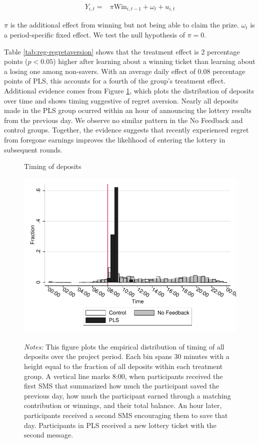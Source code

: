 \documentclass[12pt]{article}
\begin{document}
		\begin{equation} \begin{split}
		Y_{i,t} = & \pi \text{Win}_{i,t-1} + \omega_{t} + u_{i,t}
		\end{split} \label{eq:regret} \end{equation}

		$\pi$ is the additional effect from winning but not being able to claim the prize. $\omega_{t}$ is a period-specific fixed effect. We test the null hypothesis of $\pi = 0$.

		

		Table \ref{tab:reg-regretaversion} shows that the treatment effect is 2 percentage points ($p<0.05$) higher after learning about a winning ticket than learning about a losing one among non-savers. With an average daily effect of 0.08 percentage points of PLS, this accounts for a fourth of the group's treatment effect. Additional evidence comes from Figure \ref{fig:hist-deposits}, which plots the distribution of deposits over time and shows timing suggestive of regret aversion. Nearly all deposits made in the PLS group ocurred within an hour of announcing the lottery results from the previous day. We observe no similar pattern in the No Feedback and control groups. Together, the evidence suggests that recently experienced regret from foregone earnings improves the likelihood of entering the lottery in subsequent rounds.

		\begin{figure}[ht]
		\centering
		\caption{Timing of deposits}
		\includegraphics[width=\textwidth]{../../figures/hist-deposits.pdf}
		\label{fig:hist-deposits}
		\caption*{\footnotesize \emph{Notes:} This figure plots the empirical distribution of timing of all deposits over the project period. Each bin spans 30 minutes with a height equal to the fraction of all deposits within each treatment group. A vertical line marks 8:00, when participants received the first SMS that summarized how much the participant saved the previous day, how much the participant earned through a matching contribution or winnings, and their total balance. An hour later, participants received a second SMS encouraging them to save that day. Participants in PLS received a new lottery ticket with the second message.}
		\end{figure}
\end{document}
